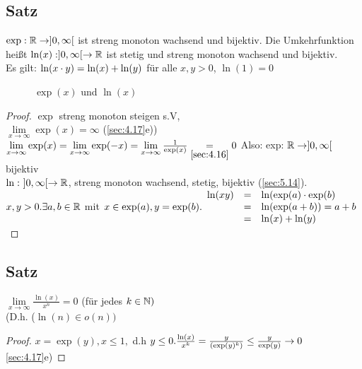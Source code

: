 \subsection[Satz: Exponentialfunktion und Logarithmus naturalis]{Satz}\label{sec:5.16}
$\exp : \mathbb{R} \to ]0,\infty[$ ist streng monoton wachsend und bijektiv. Die Umkehrfunktion hei\ss t $\ln(x) : ]0,\infty[ \to \mathbb{R}$ ist stetig und streng monoton wachsend und bijektiv.\\
Es gilt: $\ln(x \cdot y) = \ln(x) + \ln(y)$ für alle $x,y > 0$, $\ln(1) = 0$
\begin{figure}[h!]
\centering
{}
\caption{$\exp(x)$ und $\ln(x)$}
\end{figure}
\begin{proof}
$\exp$ streng monoton steigen s.V,\\
$\lim\limits_{x \to \infty} \exp(x) = \infty$ \hfill(\ref{sec:4.17}e))\\
$\lim\limits_{x \to \infty} \exp(x) = \lim\limits_{x \to \infty} \exp(-x) = \lim\limits_{x \to \infty} \frac{1}{\exp(x)} \underset{\ref{sec:4.16}}{=} 0$
Also: exp: $\mathbb{R} \to ]0,\infty[$ bijektiv\\
$\ln:\ ]0,\infty[ \to \mathbb{R}$, streng monoton wachsend, stetig, bijektiv (\ref{sec:5.14}).\\
$x,y > 0. \exists a,b \in \mathbb{R} $ mit $x \in \exp(a), y =\exp(b).\\
\begin{array}{lcl}
\ln(xy) &=& \ln(\exp(a)  \cdot \exp(b)\\
&=& \ln(\exp(a+b)) = a + b\\
&=& \ln(x) + \ln(y)\\
\end{array}$\\
\end{proof}
\subsection[Satz: Wachstum des natürlichen Logarithmus']{Satz}\label{sec:5.17}
$\lim\limits_{x \to \infty} \frac{\ln(x)}{x^n} = 0$ (für jedes $k \in \mathbb{N})$\\
(D.h. ($\ln(n) \in o(n))$\\
\begin{proof}
$x = \exp(y), x \leq 1,$ d.h $y \leq 0.\\
\frac{\ln(x)}{x^k} = \frac{y}{(\exp(y)^k)} \leq \frac{y}{\exp(y)} \to 0 $\ref{sec:4.17}e)
\end{proof}
